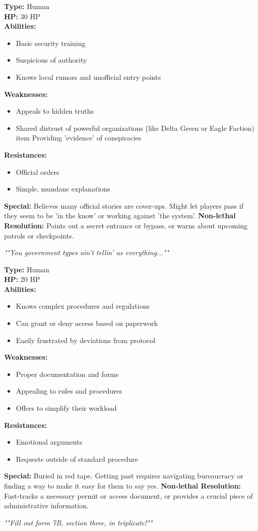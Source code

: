 \documentclass{article}
\newcommand{\monstercard}[8]{%
    \begin{tcolorbox}[
        width=5.8cm, %
        colback=boxcontentbg,
        colframe=boxborder,
        coltitle=boxheaderfg,
        colbacktitle=boxheaderbg,
        fonttitle=\bfseries\sffamily\large,
        title=#1, %
        arc=10pt, %
        boxrule=2pt, %
        left=3mm,
        right=3mm,
        top=2mm,
        bottom=2mm,
        enhanced,
        nobeforeafter,
    ]%
        \textbf{Type:} #2\\
        \textbf{HP:} #3\\
        \vspace{0.1cm} %
        \textbf{Abilities:}
        \begin{itemize}[nosep, leftmargin=*, itemsep=0pt, topsep=0pt, parsep=0pt, partopsep=0pt]
            #4
        \end{itemize}
        \vspace{0.1cm} %
        \textbf{Weaknesses:}
        \begin{itemize}[nosep, leftmargin=*, itemsep=0pt, topsep=0pt, parsep=0pt, partopsep=0pt]
            #5
        \end{itemize}
         \vspace{0.1cm} %
        \textbf{Resistances:}
        \begin{itemize}[nosep, leftmargin=*, itemsep=0pt, topsep=0pt, parsep=0pt, partopsep=0pt]
            #6
        \end{itemize}
         \vspace{0.1cm} %
        \textbf{Special:} #7
        
        \vspace{0.3cm} %
        \centering\itshape "#8"%
    \end{tcolorbox}%
}%
\begin{document}
\vspace{1cm} %

\noindent %
\begin{minipage}[t]{.48\textwidth}
\monstercard{Conspiracy-Minded Gate Guard}
{Human}
{30 HP}
{\item Basic security training\\
\item Suspicious of authority\\
\item Knows local rumors and unofficial entry points}
{\item Appeals to hidden truths\\
\item Shared distrust of powerful organizations (like Delta Green or Eagle Faction)\\item Providing 'evidence' of conspiracies}
{\item Official orders\\
\item Simple, mundane explanations}
{Believes many official stories are cover-ups. Might let players pass if they seem to be 'in the know' or working against 'the system'. \textbf{Non-lethal Resolution:} Points out a secret entrance or bypass, or warns about upcoming patrols or checkpoints.}
{"You government types ain't tellin' us everything..."}
\end{minipage}
\hfill
\begin{minipage}[t]{.48\textwidth}
\monstercard{Overworked Bureaucrat}
{Human}
{20 HP}
{\item Knows complex procedures and regulations\\
\item Can grant or deny access based on paperwork\\
\item Easily frustrated by deviations from protocol}
{\item Proper documentation and forms\\
\item Appealing to rules and procedures\\
\item Offers to simplify their workload}
{\item Emotional arguments\\
\item Requests outside of standard procedure}
{Buried in red tape. Getting past requires navigating bureaucracy or finding a way to make it easy for them to say yes. \textbf{Non-lethal Resolution:} Fast-tracks a necessary permit or access document, or provides a crucial piece of administrative information.}
{"Fill out form 7B, section three, in triplicate!"}
\end{minipage}
\end{document}
